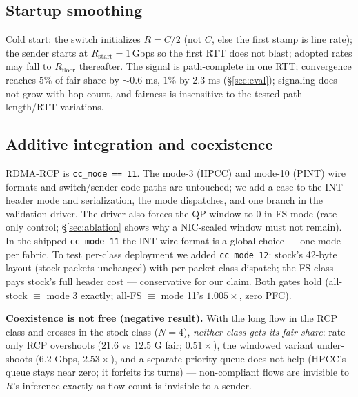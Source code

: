 \documentclass[conference]{IEEEtran}
\newcommand{\hpccfs}{\textsc{RDMA-RCP}\xspace}
\renewcommand{\paragraph}[1]{\par\smallskip\noindent\textbf{#1}\hspace{0.5em}\ignorespaces}
\begin{document}
\subsection{Startup smoothing}
\label{sec:startup}

Cold start: the switch initializes $R = C/2$ (not $C$, else the first stamp is line rate);
the sender starts at $R_{\mathrm{start}} = 1$\,Gbps so the first RTT does not blast; adopted
rates may fall to $R_{\mathrm{floor}}$ thereafter.
The signal is path-complete in one RTT; convergence reaches $5\%$ of fair share by
${\sim}0.6$ ms, $1\%$ by $2.3$ ms (\S\ref{sec:eval}); signaling does not grow with hop
count, and fairness is insensitive to the tested path-length/RTT variations.

\subsection{Additive integration and coexistence}
\label{sec:integration}

\hpccfs is \texttt{cc\_mode == 11}. The mode-3 (HPCC) and mode-10 (PINT) wire formats and
switch/sender code paths are untouched; we add a case to the INT header mode and
serialization, the mode dispatches, and one branch in the validation driver. The driver also forces the
QP window to 0 in FS mode (rate-only control; \S\ref{sec:ablation} shows why a NIC-scaled
window must not remain). In the shipped
\texttt{cc\_mode 11} the INT wire format is a global choice --- one mode per fabric. To test
per-class deployment we added \texttt{cc\_mode 12}: stock's 42-byte layout (stock packets
unchanged) with per-packet class dispatch; the FS class pays stock's full header cost ---
conservative for our claim. Both gates hold
(all-stock $\equiv$ mode 3 exactly; all-FS $\equiv$ mode 11's $1.005\times$, zero PFC).

\paragraph{Coexistence is not free (negative result).}
With the long flow in the RCP class and crosses in the stock class ($N{=}4$),
\emph{neither class gets its fair share}: rate-only RCP overshoots ($21.6$ vs $12.5$ G
fair; $0.51\times$), the windowed variant
under-shoots ($6.2$ Gbps, $2.53\times$), and a separate priority queue does not help (HPCC's queue stays near zero; it forfeits its
turns) --- non-compliant flows are invisible to $R$'s inference exactly as flow count is
invisible to a sender.
\end{document}
